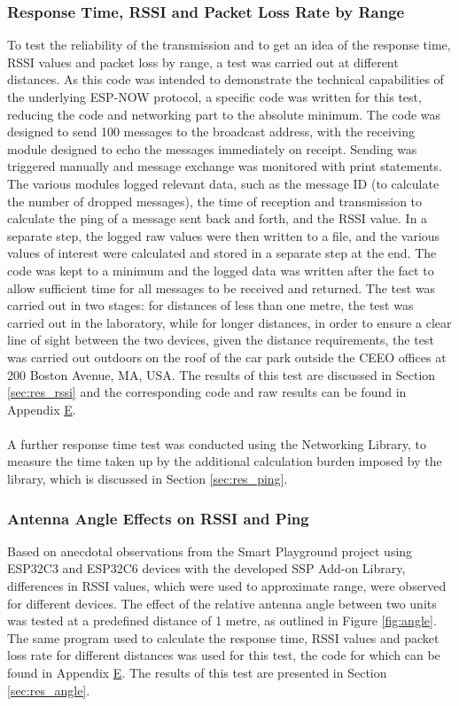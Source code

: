 \subsubsection{\label{sec:methods_test_rssi}Response Time, RSSI and Packet Loss Rate by Range}
To test the reliability of the transmission and to get an idea of the response time, RSSI values and packet loss by range, a test was carried out at different distances. As this code was intended to demonstrate the technical capabilities of the underlying ESP-NOW protocol, a specific code was written for this test, reducing the code and networking part to the absolute minimum. The code was designed to send 100 messages to the broadcast address, with the receiving module designed to echo the messages immediately on receipt. Sending was triggered manually and message exchange was monitored with print statements. The various modules logged relevant data, such as the message ID (to calculate the number of dropped messages), the time of reception and transmission to calculate the ping of a message sent back and forth, and the RSSI value. In a separate step, the logged raw values were then written to a file, and the various values of interest were calculated and stored in a separate step at the end. The code was kept to a minimum and the logged data was written after the fact to allow sufficient time for all messages to be received and returned. The test was carried out in two stages: for distances of less than one metre, the test was carried out in the laboratory, while for longer distances, in order to ensure a clear line of sight between the two devices, given the distance requirements, the test was carried out outdoors on the roof of the car park outside the CEEO offices at 200 Boston Avenue, MA, USA. The results of this test are discussed in Section \ref{sec:res_rssi} and the corresponding code and raw results can be found in Appendix \hyperref[chap:apx_e]{E}.\\\\
A further response time test was conducted using the Networking Library, to measure the time taken up by the additional calculation burden imposed by the library, which is discussed in Section \ref{sec:res_ping}.

\subsubsection{\label{sec:methods_test_angle}Antenna Angle Effects on RSSI and Ping}
Based on anecdotal observations from the Smart Playground project using ESP32C3 and ESP32C6 devices with the developed SSP Add-on Library, differences in RSSI values, which were used to approximate range, were observed for different devices. The effect of the relative antenna angle between two units was tested at a predefined distance of 1 metre, as outlined in Figure \ref{fig:angle}. The same program used to calculate the response time, RSSI values and packet loss rate for different distances was used for this test, the code for which can be found in Appendix \hyperref[chap:apx_e]{E}. The results of this test are presented in Section \ref{sec:res_angle}.

